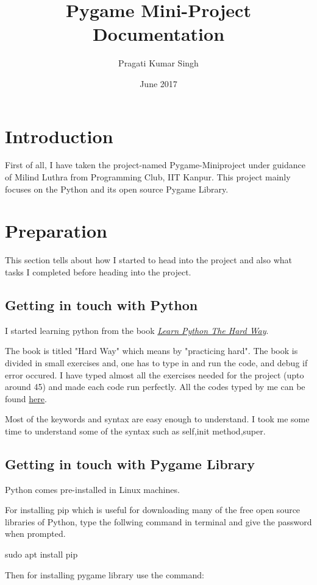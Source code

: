 \documentclass[12pt, letterpaper, twoside]{article}
\title{Pygame Mini-Project Documentation}
\author{Pragati Kumar Singh}
\date{June 2017}
\begin{document}
\maketitle
\tableofcontents
\section{Introduction}
 First of all, I have taken the project-named Pygame-Miniproject under guidance of 
Milind Luthra from Programming Club, IIT Kanpur. This project mainly focuses on the 
Python and its  open source Pygame Library.
\section{Preparation}

This section tells about how I started to head into the project and also what tasks 
I completed before heading into the project.
\subsection{Getting in touch with Python}
I started learning python from the book 
\emph{\href{http://learnpythonthehardway.org/book/}{Learn Python The Hard Way}}.

The book is titled "Hard Way" which means by "practicing hard". The book is divided 
in small exercises and, one has to type in and run the code, and debug if error 
occured.
I have typed almost all the exercises needed for the project (upto around 45) and 
made each code run perfectly. All the codes typed by me can be found 
\href{http://github.com/pragati4721/LPTHW}{here}.

Most of the keywords and syntax are easy enough to understand. I took me some time 
to understand some of the syntax such as self,init method,super.

\subsection{Getting in touch with Pygame Library}
Python comes pre-installed in Linux machines.

\noindent For installing pip which is useful for downloading many of the free open 
source libraries of Python, type the follwing command in terminal and give the 
password when prompted.

sudo apt install pip

\noindent Then for installing pygame library use the command:
\end{document}
